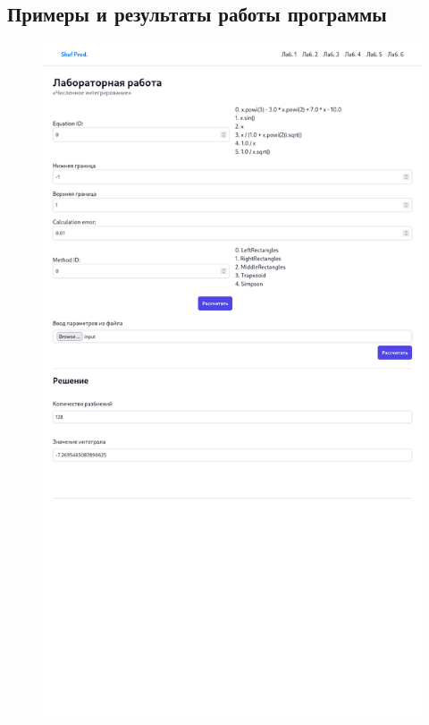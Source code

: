 \documentclass{article}
\begin{document}
      \subsection{Примеры и результаты работы программы}
            \begin{figure}[H] 
                  \begin{center}  
                         \includegraphics[scale=0.35]{ui2.png}
                        \caption{\small \sl {}}  
                  \end{center}  
            \end{figure}
\end{document}
